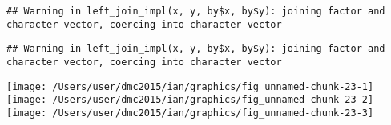 \documentclass[10pt]{report}
\newenvironment{Shaded}{}{}
\newcommand{\KeywordTok}[1]{\textcolor[rgb]{0.00,0.44,0.13}{\textbf{{#1}}}}
\newcommand{\DataTypeTok}[1]{\textcolor[rgb]{0.56,0.13,0.00}{{#1}}}
\newcommand{\StringTok}[1]{\textcolor[rgb]{0.25,0.44,0.63}{{#1}}}
\newcommand{\NormalTok}[1]{{#1}}
\begin{document}
\begin{verbatim}
## Warning in left_join_impl(x, y, by$x, by$y): joining factor and character vector, coercing into character vector
\end{verbatim}

\begin{Shaded}
\end{Shaded}

\begin{verbatim}
## Warning in left_join_impl(x, y, by$x, by$y): joining factor and character vector, coercing into character vector
\end{verbatim}

\begin{Shaded}
\end{Shaded}

\begin{center}\texttt{[image: /Users/user/dmc2015/ian/graphics/fig\_unnamed-chunk-23-1]} \texttt{[image: /Users/user/dmc2015/ian/graphics/fig\_unnamed-chunk-23-2]} \texttt{[image: /Users/user/dmc2015/ian/graphics/fig\_unnamed-chunk-23-3]} \end{center}
\end{document}
